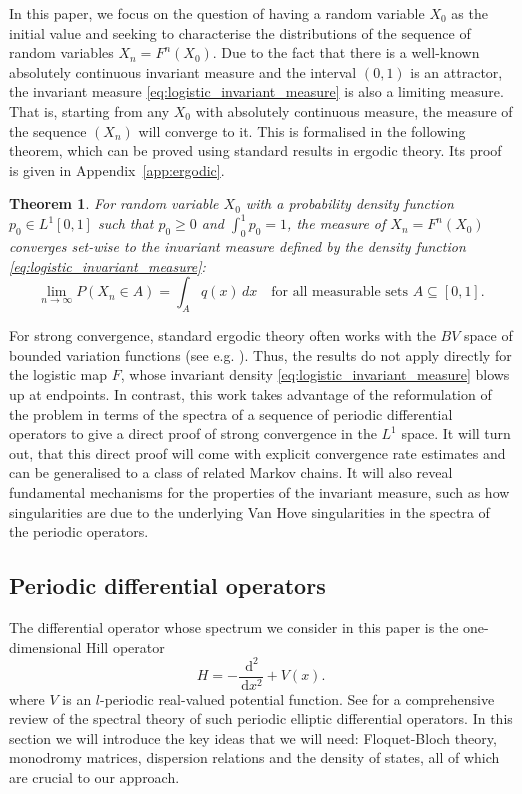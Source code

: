 \documentclass[a4paper]{article}
\newtheorem{theorem}{Theorem}%
\theoremstyle{definition}
\numberwithin{equation}{section}
\numberwithin{theorem}{section}
\newcommand{\de}{\,\mathrm{d}}
\begin{document}
{In this paper, we focus on the question of having a random variable $X_0$ as the initial value and seeking to characterise the distributions of the sequence of random variables $X_n = F^n(X_0)$. Due to the fact that there is a well-known absolutely continuous invariant measure and the interval $(0,1)$ is an attractor, the invariant measure \eqref{eq:logistic_invariant_measure} is also a limiting measure. That is, starting from any $X_0$ with absolutely continuous measure, the measure of the sequence $(X_n)$ will converge to it. This is formalised in the following theorem, which can be proved using standard results in ergodic theory. Its proof is given in Appendix~\ref{app:ergodic}.

\begin{theorem} \label{thm:ergodic}
For random variable $X_0$ with a probability density function $p_0\in L^1[0,1]$ such that $p_0\geq0$ and $\int_0^1 p_0 = 1$, the measure of $X_n = F^n(X_0)$ converges set-wise to the invariant measure defined by the density function \eqref{eq:logistic_invariant_measure}:
\begin{equation*}
    \lim_{n\rightarrow\infty}P(X_n\in A)=\int_A q(x)\,dx\quad\text{for all measurable sets $A\subseteq[0,1]$.}
\end{equation*}
\end{theorem}

For strong convergence, standard ergodic theory often works with the $BV$ space of bounded variation functions (see e.g. \cite{rychlik1983bounded, bruin2010existence, lasota1973existence}). Thus, the results do not apply directly for the logistic map $F$, whose invariant density \eqref{eq:logistic_invariant_measure} blows up at endpoints. In contrast, this work takes advantage of the reformulation of the problem in terms of the spectra of a sequence of periodic differential operators to give a direct proof of strong convergence in the $L^1$ space. It will turn out, that this direct proof will come with explicit convergence rate estimates and can be generalised to a class of related Markov chains. It will also reveal fundamental mechanisms for the properties of the invariant measure, such as how singularities are due to the underlying Van Hove singularities in the spectra of the periodic operators.


\subsection{Periodic differential operators} \label{sec:periodic_differential_operators}
The differential operator whose spectrum we consider in this paper is the one-dimensional Hill operator 
\begin{equation} \label{eq:Hdef}
    H = -\frac{\de^2}{\de x^2}+V(x).
\end{equation}
where $V$ is an $l$-periodic real-valued potential function. See \cite{kuchment2016overview} for a comprehensive review of the spectral theory of such periodic elliptic differential operators. In this section we will introduce the key ideas that we will need: Floquet-Bloch theory, monodromy matrices, dispersion relations and the density of states, all of which are crucial to our approach.

}
\end{document}
